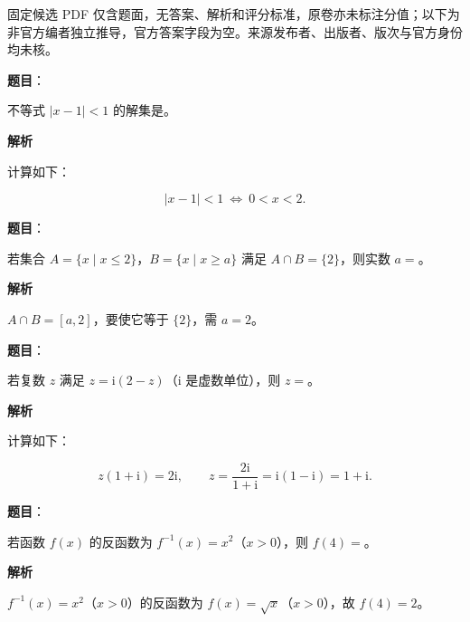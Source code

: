 

\begin{gktip}
固定候选 PDF 仅含题面，无答案、解析和评分标准，原卷亦未标注分值；以下为非官方编者独立推导，官方答案字段为空。来源发布者、出版者、版次与官方身份均未核。
\end{gktip}

\begin{answer}

\textbf{题目}：

不等式 $|x-1|<1$ 的解集是\gkblank{}。

\textbf{解析}

计算如下：

\nopagebreak[4]
\[|x-1|<1\ \Longleftrightarrow\ 0<x<2.\]


\end{answer}
\begin{answer}

\textbf{题目}：

若集合 $A=\{x\mid x\leqslant2\}$，$B=\{x\mid x\geqslant a\}$ 满足 $A\cap B=\{2\}$，则实数 $a=$\gkblank{}。

\textbf{解析}

$A\cap B=[a,2]$，要使它等于 $\{2\}$，需 $a=2$。


\end{answer}
\begin{answer}

\textbf{题目}：

若复数 $z$ 满足 $z=\mathrm i(2-z)$（$\mathrm i$ 是虚数单位），则 $z=$\gkblank{}。

\textbf{解析}

计算如下：

\nopagebreak[4]
\[z(1+\mathrm i)=2\mathrm i,\qquad z=\frac{2\mathrm i}{1+\mathrm i}=\mathrm i(1-\mathrm i)=1+\mathrm i.\]


\end{answer}
\begin{answer}

\textbf{题目}：

若函数 $f(x)$ 的反函数为 $f^{-1}(x)=x^2$（$x>0$），则 $f(4)=$\gkblank{}。

\textbf{解析}

$f^{-1}(x)=x^2$（$x>0$）的反函数为 $f(x)=\sqrt x$（$x>0$），故 $f(4)=2$。


\end{answer}
